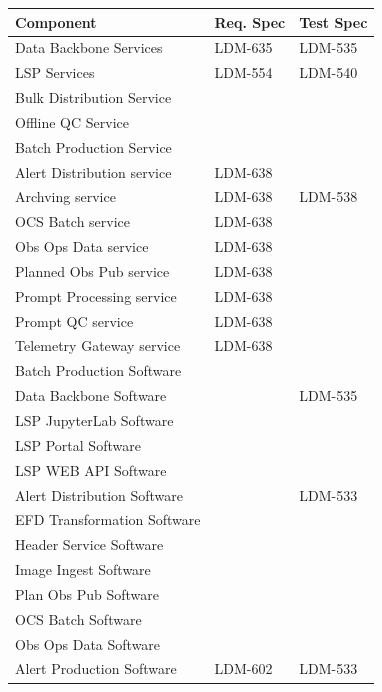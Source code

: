 {\footnotesize
\begin{longtable}[]{p{5cm}|p{2cm}|p{2cm}}\hline
{\bf Component} & {\bf Req. Spec} & {\bf Test Spec} \\ \hline
\endhead
Data Backbone Services & \cellcolor{pastelyellow} LDM-635 & \cellcolor{pastelyellow} LDM-535 \\\hline
LSP Services & \cellcolor{pastelyellow} LDM-554 & \cellcolor{pastelyellow} LDM-540 \\\hline
Bulk Distribution Service & & \\\hline
Offline QC Service & & \\\hline
Batch Production Service & & \\\hline
Alert Distribution service & \cellcolor{pastelyellow} LDM-638 & \\\hline
Archving service & \cellcolor{pastelyellow} LDM-638 & \cellcolor{ballblue} LDM-538 \\\hline
OCS Batch service & \cellcolor{pastelyellow} LDM-638 & \\\hline
Obs Ops Data service & \cellcolor{pastelyellow} LDM-638 & \\\hline
Planned Obs Pub service & \cellcolor{pastelyellow} LDM-638 & \\\hline
Prompt Processing service & \cellcolor{pastelyellow} LDM-638 & \\\hline
Prompt QC service & \cellcolor{pastelyellow} LDM-638 & \\\hline
Telemetry Gateway service & \cellcolor{pastelyellow} LDM-638 & \\\hline
Batch Production Software & & \\\hline
Data Backbone Software & & \cellcolor{pastelyellow} LDM-535 \\\hline
LSP JupyterLab Software & & \\\hline
LSP Portal Software & & \\\hline
LSP WEB API Software & & \\\hline
Alert Distribution Software & & \cellcolor{ballblue} LDM-533 \\\hline
EFD Transformation Software & & \\\hline
Header Service Software & & \\\hline
Image Ingest Software & & \\\hline
Plan Obs Pub Software & & \\\hline
OCS Batch Software & & \\\hline
Obs Ops Data Software & & \\\hline
Alert Production Software & \cellcolor{ballblue} LDM-602 & \cellcolor{ballblue} LDM-533 \\\hline

\end{longtable}}

